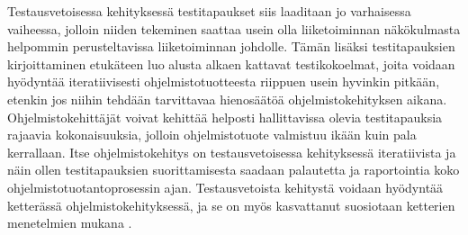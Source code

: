   Testausvetoisessa kehityksessä testitapaukset siis laaditaan jo varhaisessa vaiheessa, jolloin niiden tekeminen saattaa usein olla liiketoiminnan näkökulmasta helpommin perusteltavissa liiketoiminnan johdolle.
  Tämän lisäksi testitapauksien kirjoittaminen etukäteen luo alusta alkaen kattavat testikokoelmat, joita voidaan hyödyntää iteratiivisesti ohjelmistotuotteesta riippuen usein hyvinkin pitkään, etenkin jos niihin tehdään tarvittavaa hienosäätöä ohjelmistokehityksen aikana.
  Ohjelmistokehittäjät voivat kehittää helposti hallittavissa olevia testitapauksia rajaavia kokonaisuuksia, jolloin ohjelmistotuote valmistuu ikään kuin pala kerrallaan.
  Itse ohjelmistokehitys on testausvetoisessa kehityksessä iteratiivista ja näin ollen testitapauksien suorittamisesta saadaan palautetta ja raportointia koko ohjelmistotuotantoprosessin ajan.
  Testausvetoista kehitystä voidaan hyödyntää ketterässä ohjelmistokehityksessä, ja se on myös kasvattanut suosiotaan ketterien menetelmien mukana \parencite{tdd_popularity}.
